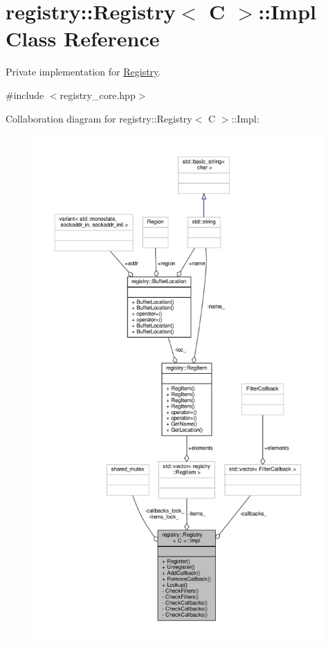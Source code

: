 \hypertarget{classregistry_1_1Registry_1_1Impl}{}\section{registry\+:\+:Registry$<$ C $>$\+:\+:Impl Class Reference}
\label{classregistry_1_1Registry_1_1Impl}


Private implementation for \hyperlink{classregistry_1_1Registry}{Registry}.  




{\ttfamily \#include $<$registry\+\_\+core.\+hpp$>$}



Collaboration diagram for registry\+:\+:Registry$<$ C $>$\+:\+:Impl\+:\nopagebreak
\begin{figure}[H]
\begin{center}
\leavevmode
\includegraphics[height=550pt]{classregistry_1_1Registry_1_1Impl__coll__graph}
\end{center}
\end{figure}
